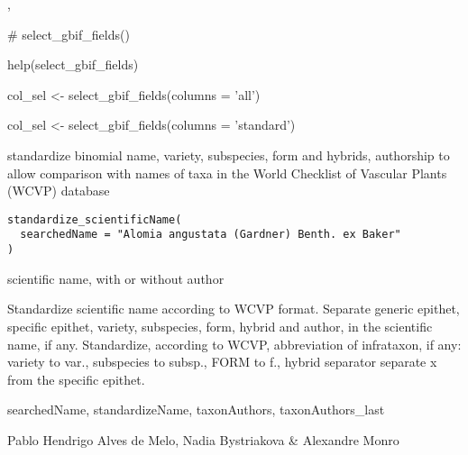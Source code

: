 \documentclass[a4paper]{book}
\begin{document}
%
\begin{SeeAlso}
, 
\end{SeeAlso}
%
\begin{Examples}
\begin{ExampleCode}

# select_gbif_fields()

help(select_gbif_fields)

col_sel <- select_gbif_fields(columns = 'all')

col_sel <- select_gbif_fields(columns = 'standard')


\end{ExampleCode}
\end{Examples}
%
\begin{Description}
standardize binomial name, variety, subspecies, form and hybrids, authorship
to allow comparison with names of taxa in the World Checklist of Vascular Plants (WCVP) database
\end{Description}
%
\begin{Usage}
\begin{verbatim}
standardize_scientificName(
  searchedName = "Alomia angustata (Gardner) Benth. ex Baker"
)
\end{verbatim}
\end{Usage}
%
\begin{Arguments}
\begin{ldescription}
\item[\code{searchedName}] scientific name, with or without author
\end{ldescription}
\end{Arguments}
%
\begin{Details}
Standardize scientific name according to WCVP format.
Separate generic epithet, specific epithet, variety, subspecies, form, hybrid and author, in the scientific name, if any.
Standardize, according to WCVP, abbreviation of infrataxon, if any:
variety to var.,
subspecies to subsp.,
FORM to f.,
hybrid separator separate x from the specific epithet.
\end{Details}
%
\begin{Value}
searchedName,
standardizeName,
taxonAuthors,
taxonAuthors\_last
\end{Value}
%
\begin{Author}
Pablo Hendrigo Alves de Melo,
Nadia Bystriakova \&
Alexandre Monro
\end{Author}
\end{document}
